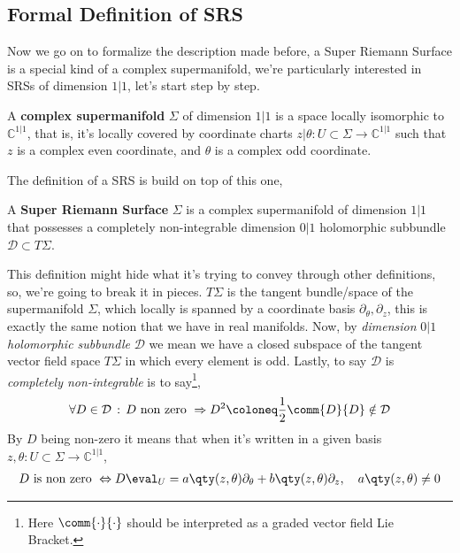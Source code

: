 \subsection{Formal Definition of SRS}

Now we go on to formalize the description made before, a Super Riemann Surface is a 
special kind of a complex supermanifold, we're particularly interested in SRSs of 
dimension $1|1$, let's start step by step. 
\begin{definition}
    A \textbf{complex supermanifold} $\Sigma$ of dimension $1|1$ is a space locally isomorphic 
    to $\mathbb C^{1|1}$, that is, it's locally covered by coordinate charts $z|\theta:U\subset\Sigma\rightarrow\mathbb C^{1|1}$ 
    such that $z$ is a complex even coordinate, and $\theta$ is a complex odd coordinate.
\end{definition}
The definition of a SRS is build on top of this one,
\begin{definition}
    A \textbf{Super Riemann Surface} $\Sigma$ is a complex supermanifold of dimension $1|1$ that 
    possesses a completely non-integrable dimension $0|1$ holomorphic subbundle $\mathcal D\subset T\Sigma$.
\end{definition}
This definition might hide what it's trying to convey through other definitions, so, we're going to break it 
in pieces. $T\Sigma$ is the tangent bundle/space of the supermanifold $\Sigma$, which locally is spanned by a coordinate 
basis $\partial_\theta,\partial_z$, this is exactly the same notion that we have 
in real manifolds. Now, by \textit{dimension }$0|1$\textit{ holomorphic subbundle }$\mathcal D$ we 
mean we have a closed subspace of the tangent vector field space $T\Sigma$ in which every element is 
odd. Lastly, to say $\mathcal D$ is \textit{completely non-integrable} is to say\footnote{Here $\comm{\cdot}{\cdot}$ should 
be interpreted as a graded vector field Lie Bracket.},
\begin{align*}
    \forall D\in\mathcal D\,:\, D\textnormal{ non zero }\Rightarrow D^2\coloneq\frac12\comm{D}{D}\notin\mathcal D
\end{align*}
By $D$ being non-zero it means that when it's written in a given basis $z,\theta:U\subset\Sigma\rightarrow \mathbb C^{1|1}$,
\begin{align*}
    D\textnormal{ is non zero }\Leftrightarrow D\eval_U=a\qty(z,\theta)\partial_\theta+b\qty(z,\theta)\partial_z,\ \ \ a\qty(z,\theta)\neq 0
\end{align*}